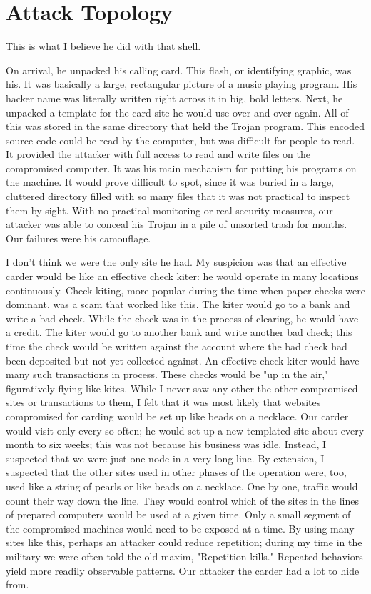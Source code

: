 \section{Attack Topology}
This is what I believe he did with that shell.

On arrival, he unpacked his calling card.  This flash, or identifying graphic, was his.  It was basically a large, rectangular picture of a music playing program.  His hacker name was literally written right across it in big, bold letters.  Next, he unpacked a template for the card site he would use over and over again.  All of this was stored in the same directory that held the Trojan program.  This encoded source code could be read by the computer, but was difficult for people to read.  It provided the attacker with full access to read and write files on the compromised computer.  It was his main mechanism for putting his programs on the machine.  It would prove difficult to spot, since it was buried in a large, cluttered directory filled with so many files that it was not practical to inspect them by sight.  With no practical monitoring or real security measures, our attacker was able to conceal his Trojan in a pile of unsorted trash for months.  Our failures were his camouflage.

I don't think we were the only site he had.  My suspicion was that an effective carder would be like an effective check kiter:  he would operate in many locations continuously.  Check kiting, more popular during the time when paper checks were dominant, was a scam that worked like this.  The kiter would go to a bank and write a bad check.  While the check was in the process of clearing, he would have a credit.  The kiter would go to another bank and write another bad check; this time the check would be written against the account where the bad check had been deposited but not yet collected against.  An effective check kiter would have many such transactions in process.  These checks would be "up in the air," figuratively flying like kites.  While I never saw any other the other compromised sites or transactions to them, I felt that it was most likely that websites compromised for carding would be set up like beads on a necklace.  Our carder would visit only every so often; he would set up a new templated site about every month to six weeks; this was not because his business was idle.  Instead, I suspected that we were just one node in a very long line.  By extension, I suspected that the other sites used in other phases of the operation were, too, used like a string of pearls or like beads on a necklace.  One by one, traffic would count their way down the line.  They would control which of the sites in the lines of prepared computers would be used at a given time.  Only a small segment of the compromised machines would need to be exposed at a time.  By using many sites like this, perhaps an attacker could reduce repetition; during my time in the military we were often told the old maxim, "Repetition kills."  Repeated behaviors yield more readily observable patterns.  Our attacker the carder had a lot to hide from.

